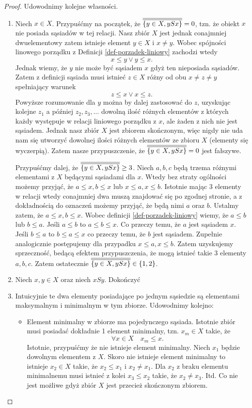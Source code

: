 \documentclass[12pt,a4paper]{report}
\begin{document}
\begin{proof}
Udowodnimy kolejne własności.
\begin{enumerate}
\item Niech $x \in X$. Przypuśćmy na początek, że $\overline{\overline{\{y \in X, ySx\}}} = 0$, tzn. że obiekt $x$ nie posiada sąsiadów w tej relacji. Nasz zbiór $X$ jest jednak conajmniej dwuelementowy zatem istnieje element $y \in X$ i $ x \neq y$. Wobec spójności linowego porządku z Definicji \ref{def-porzadek-liniowy} zachodzi wtedy
$$
x \leq y \lor y \leq x.
$$
Jednak wiemy, że $y$ nie może być sąsiadem $x$ gdyż ten nieposiada sąsiadów. Zatem z definicji sąsiada musi istnieć $z \in X$ różny od obu $x \neq z \neq y$ spełniający warunek
$$
z \leq x \lor x \leq z.
$$
Powyższe rozumowanie dla $y$ można by dalej zastosować do $z$, uzyskując kolejne $z_1$ a później $z_2,z_3, \ldots$ dowolną ilość różnych elementów z których każdy występuje w relacji liniowego porządku z $x$, ale żaden z nich nie jest sąsiadem. Jednak nasz zbiór $X$ jest zbiorem skończonym, więc nigdy nie uda nam się utworzyć dowolnej ilości różnych elementów ze zbioru $X$ (elementy się wyczerpią). Zatem nasze przypuszczenie, że $\overline{\overline{\{y \in X, ySx\}}} = 0$ jest fałszywe.

Przypuśćmy dalej, że $\overline{\overline{\{y \in X, ySx\}}} \geq 3$. Niech $a,b,c$ będą trzema różnymi elementami z $X$ będącymi sąsiadami dla $x$. Wtedy bez straty ogólności możemy przyjąć, że $a \leq x, b \leq x$ lub $x \leq a, x \leq b$. Istotnie mając 3 elementy w relacji wtedy conajmniej dwa muszą znajdować się po zgodnej stronie, a z dokładnością do oznaczeń możemy przyjąć, że będą nimi $a$ oraz $b$. Ustalmy zatem, że $a \leq x, b \leq x$. Wobec definicji \ref{def-porzadek-liniowy} wiemy, że $a \leq b$ lub $b \leq a$. Jeśli $a \leq b$ to $a \leq b \leq x$. Co przeczy temu, że $a$ jest sąsiadem $x$. Jeśli $b \leq a$ to $b \leq a \leq x$ co przeczy temu, że $b$ jest sąsiadem. Zupełnie analogicznie postępujemy dla przypadku $x \leq a, x \leq b$. Zatem uzyskujemy sprzeczność, bedącą efektem przypuszczenia, że mogą istnieć takie 3 elementy $a,b,c$. Zatem ostatecznie $\overline{\overline{\{y \in X, ySx\}}} \in \{ 1,2 \}$.
\item Niech $x,y \in X$ oraz niech $xSy$. {\color{red} Dokończyć} %
\item Intuicyjnie te dwa elementy posiadające po jednym sąsiedzie są elementami maksymalnym i minimalnym w tym zbiorze. Udowodnimy kolejno:
\begin{itemize}
\item Element minimalny w zbiorze ma pojedynczego sąsiada. Istotnie zbiór musi posiadać dokładnie 1 element minimalny, tzn. $x_m \in X$ takie, że 
$$
\forall x \in X \quad x_m \leq x.
$$
Istotnie, przypuśćmy że nie istnieje element minimalny. Niech $x_1$ będzie dowolnym elementem z $X$. Skoro nie istnieje element minimalny to istnieje $x_2 \in X$ takie, że $x_2 \leq x_1$ i $x_2 \neq x_1$. Dla $x_2$ z braku elementu minimalnemu musi istnieć z kolei $x_3 \leq x_2$ takie, że $x_2 \neq x_3$. Itd. Co nie jest możliwe gdyż zbiór $X$ jest przecież skończonym zbiorem.


\end{itemize}
\end{enumerate}
\end{proof}
\end{document}
